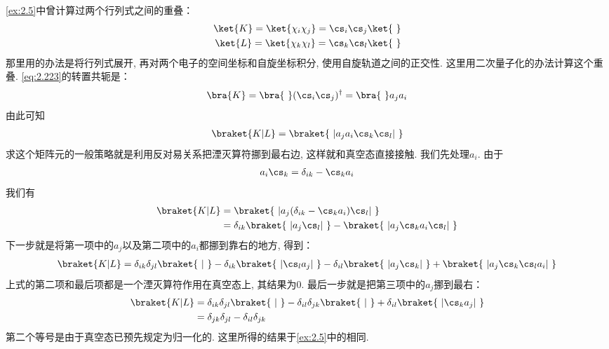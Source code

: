 \autoref{ex:2.5}中曾计算过两个行列式之间的重叠：
\begin{align}\label{eq:2.223}
\ket{K} = \ket{\chi_i\chi_j} = \cs_i\cs_j\ket{\,\,}\\
\ket{L} = \ket{\chi_k\chi_l} = \cs_k\cs_l\ket{\,\,}
\label{eq:2.224}
\end{align}
那里用的办法是将行列式展开, 
再对两个电子的空间坐标和自旋坐标积分, 
使用自旋轨道之间的正交性. 
这里用二次量子化的办法计算这个重叠. 
\autoref{eq:2.223}的转置共轭是：
\begin{align}
\bra{K} = \bra{\,\,}(\cs_i\cs_j)^\dagger = \bra{\,\,}a_ja_i
\end{align}
由此可知
\begin{align}
\braket{K|L} = \braket{\,\,|a_ja_i\cs_k\cs_l|\,\,}
\end{align}
求这个矩阵元的一般策略就是利用反对易关系把湮灭算符挪到最右边, 
这样就和真空态直接接触. 
我们先处理$a_i$. 
由于
\begin{align}
a_i\cs_k = \delta_{ik} - \cs_ka_i
\end{align}
我们有
\begin{align}\nonumber
\braket{K|L} & = \braket{\,\,|a_j(\delta_{ik}-\cs_ka_i)\cs_l|\,\,}\\
             & = \delta_{ik}\braket{\,\,|a_j\cs_l|\,\,} - \braket{\,\,|a_j\cs_ka_i\cs_l|\,\,}
\end{align}
下一步就是将第一项中的$a_j$以及第二项中的$a_i$都挪到靠右的地方, 
得到：
\begin{align}
\braket{K|L} = \delta_{ik}\delta_{jl} \braket{\,\,|\,\,} - \delta_{ik}\braket{\,\,|\cs_la_j|\,\,} - \delta_{il}\braket{\,\,|a_j\cs_k|\,\,} + \braket{\,\,|a_j\cs_k\cs_la_i|\,\,}
\end{align}
上式的第二项和最后项都是一个湮灭算符作用在真空态上, 
其结果为$0$. 
最后一步就是把第三项中的$a_j$挪到最右：
\begin{align}
\braket{K|L} & = \delta_{ik}\delta_{jl} \braket{\,\,|\,\,} - \delta_{il}\delta_{jk}\braket{\,\,|\,\,} + \delta_{il}\braket{\,\,|\cs_ka_j|\,\,}\notag\\
& = \delta_{jk}\delta_{jl} - \delta_{il}\delta_{jk}
\end{align}
第二个等号是由于真空态已预先规定为归一化的. 
这里所得的结果于\autoref{ex:2.5}中的相同. 

